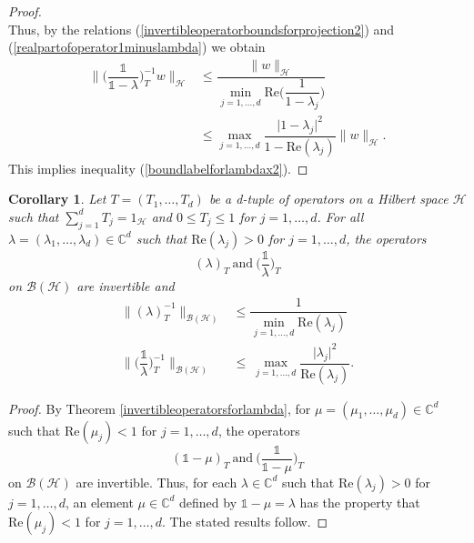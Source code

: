 \documentclass[11pt, reqno]{amsart}
\newtheorem{corollary}[theorem]{Corollary}
\newcommand\1{\boldsymbol {1}}
\numberwithin{equation}{section}
\begin{document}
\begin{proof}
\begin{equation}
\end{equation}
Thus, by the relations (\ref{invertibleoperatorboundsforprojection2}) and (\ref{realpartofoperator1minuslambda}) we obtain
\begin{align*}
    \bigg\| \bigg(\dfrac{\mathds{1}}{\mathds{1}-\lambda}\bigg)_{T}^{-1}w \bigg\|_{\mathcal{H}} &\leq \dfrac{\|w\|_{\mathcal{H}}}{\underset{j=1,\hdots,d}{\min}\mathrm{Re}\bigg(\dfrac{1}{1-\lambda_{j}}\bigg)} \\
    &\leq \underset{j=1,\hdots,d}{\max}\dfrac{\lvert 1-\lambda_{j}\rvert^{2}}{1-\mathrm{Re}(\lambda_{j})}\|w\|_{\mathcal{H}}.
\end{align*}
This implies inequality (\ref{boundlabelforlambdax2}).  \end{proof}

\begin{corollary}\label{invertibleoperatorsforlambdacorollary}
Let $T=(T_{1},\hdots, T_{d})$ be a d-tuple of operators on a Hilbert space $\mathcal{H}$ such that $\sum_{j=1}^{d}T_{j}=1_{\mathcal{H}}$ and $0\leq T_{j}\leq 1$ for $j=1,\hdots, d$. For all $\lambda=(\lambda_{1},\hdots,\lambda_{d})\in\mathbb{C}^{d}$ such that $\mathrm{Re}(\lambda_{j})>0$ for $j=1,\hdots,d$, the operators   
$$(\lambda)_{T}~\text{and}~\bigg(\dfrac{\mathds{1}}{\lambda}\bigg)_{T}$$
on $\mathcal{B(H)}$ are invertible and
\begin{align*}
\Big\| (\lambda)_{T}^{-1} \Big\|_{\mathcal{B(H)}} & \leq \dfrac{1}{\underset{j=1,\hdots, d}{\min}\mathrm{Re}(\lambda_{j})} \\
\Bigg\| \bigg(\dfrac{\mathds{1}}{\lambda}\bigg)_{T}^{-1} \Bigg\|_{\mathcal{B(H)}} &\leq ~ \max_{j=1,\hdots,d}\dfrac{\lvert \lambda_{j} \rvert^{2}}{\mathrm{Re}(\lambda_{j})}.
\end{align*}
\end{corollary}
\begin{proof}
By Theorem \ref{invertibleoperatorsforlambda}, for $\mu=(\mu_{1},\hdots,\mu_{d})\in\mathbb{C}^{d}$ such that $\mathrm{Re}(\mu_{j})<1$ for $j=1,\hdots,d$, the operators
$$(\mathds{1}-\mu)_{T}~\text{and}~\bigg(\dfrac{\mathds{1}}{\mathds{1}-\mu}\bigg)_{T}$$
on $\mathcal{B(H)}$ are invertible. Thus, for each $\lambda\in\mathbb{C}^{d}$ such that $\mathrm{Re}(\lambda_{j})>0$ for $j=1,\hdots,d$, an element $\mu\in\mathbb{C}^{d}$ defined by $\mathds{1}-\mu=\lambda$ has the property that $\mathrm{Re}(\mu_{j})<1$ for $j=1,\hdots,d$. The stated results follow.\end{proof}
\end{document}
